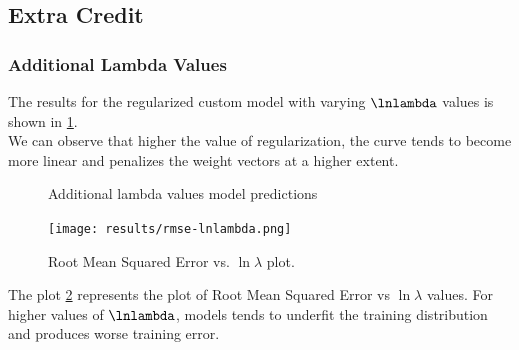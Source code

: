 \documentclass[12pt,twoside,a4paper]{article}
\begin{document}
\subsection{Extra Credit}

\subsubsection{Additional Lambda Values}

The results for the regularized custom model with varying $\lnlambda$ values is shown in \ref{VARLN}. \\ We can observe that higher the value of regularization, the curve tends to become more linear and penalizes the weight vectors at a higher extent.

\begin{figure}[H]
    \centering
    \hspace{0mm}
    \hspace{0mm}
    \hspace{0mm}
    \caption{Additional lambda values model predictions}
    \label{VARLN}
\end{figure}
\begin{figure}[H]
    \centering
    \texttt{[image: results/rmse-lnlambda.png]}
    \caption{Root Mean Squared Error vs. $\ln \lambda$ plot.}
    \label{LNLAMBDARMSE}
\end{figure}
The plot \ref{LNLAMBDARMSE} represents the plot of Root Mean Squared Error vs $\ln\lambda$ values. For higher values of $\lnlambda$, models tends to underfit the training distribution and produces worse training error.
\end{document}
